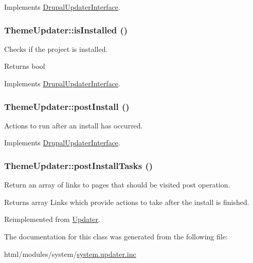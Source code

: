 Implements \hyperlink{interfaceDrupalUpdaterInterface_a2d619c7d5c0e869f13651543587419f1}{DrupalUpdaterInterface}.\hypertarget{classThemeUpdater_aa150c0bf1bc488f7cc32f681eb7ff4b6}{
\subsubsection[{isInstalled}]{\setlength{\rightskip}{0pt plus 5cm}ThemeUpdater::isInstalled ()}}
\label{classThemeUpdater_aa150c0bf1bc488f7cc32f681eb7ff4b6}
Checks if the project is installed.

\begin{DoxyReturn}{Returns}
bool 
\end{DoxyReturn}


Implements \hyperlink{interfaceDrupalUpdaterInterface_af4e78762c89a91a4a2a7dd2fb325f214}{DrupalUpdaterInterface}.\hypertarget{classThemeUpdater_a66e74f3e7f7116e77355947e11d038e1}{
\subsubsection[{postInstall}]{\setlength{\rightskip}{0pt plus 5cm}ThemeUpdater::postInstall ()}}
\label{classThemeUpdater_a66e74f3e7f7116e77355947e11d038e1}
Actions to run after an install has occurred. 

Implements \hyperlink{interfaceDrupalUpdaterInterface_a392c2cdc12736286a18ec819732f9156}{DrupalUpdaterInterface}.\hypertarget{classThemeUpdater_a0ed994865cfa41230a515aa3d759e693}{
\subsubsection[{postInstallTasks}]{\setlength{\rightskip}{0pt plus 5cm}ThemeUpdater::postInstallTasks ()}}
\label{classThemeUpdater_a0ed994865cfa41230a515aa3d759e693}
Return an array of links to pages that should be visited post operation.

\begin{DoxyReturn}{Returns}
array Links which provide actions to take after the install is finished. 
\end{DoxyReturn}


Reimplemented from \hyperlink{classUpdater_a59eb832c6bb80dd9f04fc85c8ebe8905}{Updater}.

The documentation for this class was generated from the following file:\begin{DoxyCompactItemize}
\item 
html/modules/system/\hyperlink{system_8updater_8inc}{system.updater.inc}\end{DoxyCompactItemize}
